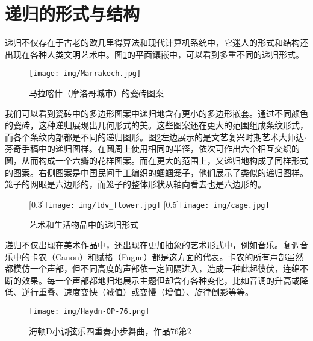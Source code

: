 \documentclass[b5paper]{ctexart}
\begin{document}
\section{递归的形式与结构}

递归不仅存在于古老的欧几里得算法和现代计算机系统中，它迷人的形式和结构还出现在各种人类文明艺术中。图\ref{fig:Ceramic-Tile-Tessellations-Marrakech}的平面镶嵌中，可以看到多重不同的递归形式。

\begin{figure}[htbp]
 \centering
 \texttt{[image: img/Marrakech.jpg]}
 \caption{马拉喀什（摩洛哥城市）的瓷砖图案}
 \label{fig:Ceramic-Tile-Tessellations-Marrakech}
\end{figure}

我们可以看到瓷砖中的多边形图案中递归地含有更小的多边形嵌套。通过不同颜色的瓷砖，这种递归展现出几何形式的美。这些图案还在更大的范围组成条纹形式，而各个条纹内部都是不同的递归图形。图\ref{fig:flower}左边展示的是文艺复兴时期艺术大师达$\cdot$芬奇手稿中的递归图样。在圆周上使用相同的半径，依次可作出六个相互交织的圆，从而构成一个六瓣的花样图案。而在更大的范围上，又递归地构成了同样形式的图案。右侧图案是中国民间手工编织的蝈蝈笼子，他们展示了类似的递归图样。笼子的网眼是六边形的，而笼子的整体形状从轴向看去也是六边形的。

\begin{figure}[htbp]
 \centering
 [0.3\linewidth]{\texttt{[image: img/ldv\_flower.jpg]}} \quad
 [0.5\linewidth]{\texttt{[image: img/cage.jpg]}}
 \caption{艺术和生活物品中的递归形式}
 \label{fig:flower}
\end{figure}

递归不仅出现在美术作品中，还出现在更加抽象的艺术形式中，例如音乐。复调音乐中的卡农（Canon）和赋格（Fugue）都是这方面的代表。卡农的所有声部虽然都模仿一个声部，但不同高度的声部依一定间隔进入，造成一种此起彼伏，连绵不断的效果。每一个声部都地归地展示主题但却含有各种变化，比如音调的升高或降低、逆行重叠、速度变快（减值）或变慢（增值）、旋律倒影等等。

\begin{figure}[htbp]
 \centering
 \texttt{[image: img/Haydn-OP-76.png]}
 \caption{海顿D小调弦乐四重奏小步舞曲，作品76第2}
 \label{fig:Haydn-OP-76}
\end{figure}
\end{document}

